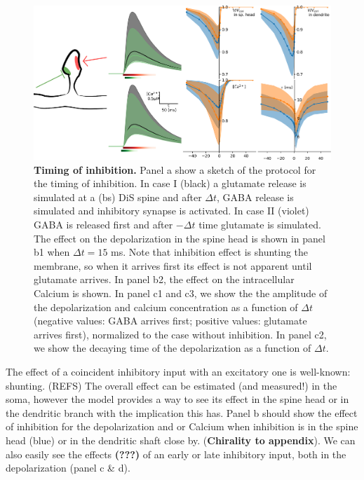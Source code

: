 \documentclass[10pt,letterpaper]{article}
\begin{document}
\begin{figure}[htb!]
\includegraphics[width=1.0\linewidth]{f2}
\caption{{\bf Timing of inhibition.} Panel a show a sketch of the protocol for the timing of inhibition. In case  I (black) a glutamate release is simulated at a (bs) DiS spine and after $\Delta t$, GABA release is simulated and inhibitory synapse is activated. In case II (violet) GABA is released first and after $-\Delta t$ time  glutamate is simulated. The effect on the depolarization in the spine head is shown in panel b1 when $\Delta t= 15$ ms. Note that inhibition effect is shunting the membrane, so when it arrives first its effect is not apparent until glutamate arrives. In panel b2, the effect on the intracellular Calcium is shown.
In panel c1 and c3, we show the the amplitude of the depolarization and calcium concentration as a function of $\Delta t$ (negative values: GABA arrives first; positive values: glutamate arrives first), normalized to the case without inhibition. In panel c2, we show the decaying time of the depolarization as a function of $\Delta t$.
}\label{fig:TimingInhibition}
\end{figure}

The effect of a coincident inhibitory input with an excitatory one is well-known: shunting. (REFS) The overall effect can be estimated (and measured!) in the soma, however the model provides a way to see its effect in the spine head or in the dendritic branch with the implication this has. Panel b should show the effect of inhibition for the depolarization and or Calcium when inhibition is in the spine head (blue) or in the dendritic shaft close by. ({\bf Chirality to appendix}). We can also easily see the effects \textbf{(???)} of an early or late inhibitory input, both in the depolarization (panel c \& d). 
\end{document}
